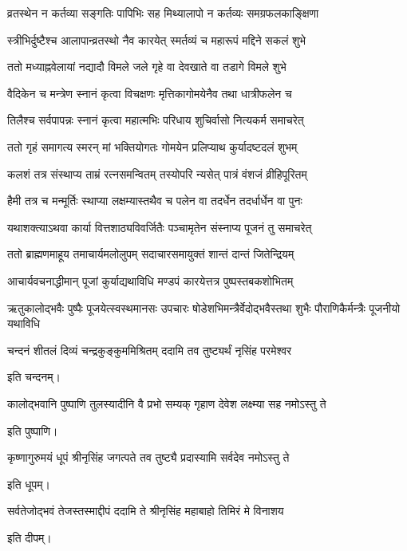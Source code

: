 \twolineshloka
{व्रतस्थेन न कर्तव्या सङ्गतिः पापिभिः सह}
{मिथ्यालापो न कर्तव्यः समग्रफलकाङ्क्षिणा} %

\twolineshloka
{स्त्रीभिर्दुष्टैश्च आलापान्व्रतस्थो नैव कारयेत्}
{स्मर्तव्यं च महारूपं मद्दिने सकलं शुभे} %

\twolineshloka
{ततो मध्याह्नवेलायां नद्यादौ विमले जले}
{गृहे वा देवखाते वा तडागे विमले शुभे} %

\twolineshloka
{वैदिकेन च मन्त्रेण स्नानं कृत्वा विचक्षणः}
{मृत्तिकागोमयेनैव तथा धात्रीफलेन च} %

\twolineshloka
{तिलैश्च सर्वपापन्नः स्नानं कृत्वा महात्मभिः}
{परिधाय शुचिर्वासो नित्यकर्म समाचरेत्} %

\twolineshloka
{ततो गृहं समागत्य स्मरन् मां भक्तियोगतः}
{गोमयेन प्रलिप्याथ कुर्यादष्टदलं शुभम्} %

\twolineshloka
{कलशं तत्र संस्थाप्य ताम्रं रत्नसमन्वितम्}
{तस्योपरि न्यसेत् पात्रं वंशजं व्रीहिपूरितम्} %

\twolineshloka
{हैमी तत्र च मन्मूर्तिः स्थाप्या लक्षम्यास्तथैव च}
{पलेन वा तदर्धेन तदर्धार्धेन वा पुनः} %

\twolineshloka
{यथाशक्त्याऽथवा कार्या वित्तशाठ्यविवर्जितैः}
{पञ्चामृतेन संस्नाप्य पूजनं तु समाचरेत्} %

\twolineshloka
{ततो ब्राह्मणमाहूय तमाचार्यमलोलुपम्}
{सदाचारसमायुक्तं शान्तं दान्तं जितेन्द्रियम्} %

\twolineshloka
{आचार्यवचनाद्धीमान् पूजां कुर्याद्यथाविधि}
{मण्डपं कारयेत्तत्र पुष्पस्तबकशोभितम्} %

\threelineshloka
{ऋतुकालोद्भवैः पुष्पैः पूजयेत्स्वस्थमानसः}
{उपचारः षोडेशभिमन्त्रैर्वेदोद्भवैस्तथा} %
{शुभैः पौराणिकैर्मन्त्रैः पूजनीयो यथाविधि}

\twolineshloka
{चन्दनं शीतलं दिव्यं चन्द्रकुङ्कुममिश्रितम्}
{ददामि तव तुष्ट्यर्थं नृसिंह परमेश्वर} %

इति चन्दनम्।

\twolineshloka
{कालोद्भवानि पुष्पाणि तुलस्यादीनि वै प्रभो}
{सम्यक् गृहाण देवेश लक्ष्म्या सह नमोऽस्तु ते} %

इति पुष्पाणि।

\twolineshloka
{कृष्णागुरुमयं धूपं श्रीनृसिंह जगत्पते}
{तव तुष्ट्यै प्रदास्यामि सर्वदेव नमोऽस्तु ते} %

इति धूपम्।

\twolineshloka
{सर्वतेजोद्भवं तेजस्तस्माद्दीपं ददामि ते}
{श्रीनृसिंह महाबाहो तिमिरं मे विनाशय} %

इति दीपम्।

